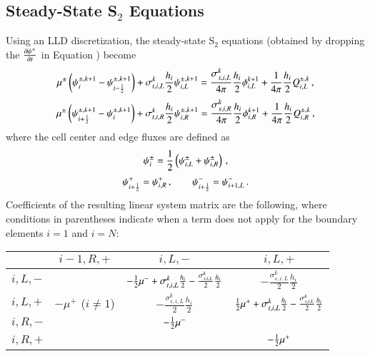 \documentclass[preprint,12pt]{elsarticle}
\newcommand{\sigsL}{\frac{\sigma_{s,i,L}^k}{2}}
\newcommand{\sigtL}{\sigma_{t,i,L}^k}
\newcommand{\halfh}{\frac{h_i}{2}}
\begin{document}
\subsection{Steady-State \texorpdfstring{S$_2$}{S-2} Equations}
Using an LLD discretization, the steady-state
S$_2$ equations (obtained by dropping the $\frac{\partial \psi^\pm}{\partial t}$ in Equation
) become
\begin{equation}
  \mu^\pm\fn{\psi^{\pm,k+1}_i - \psi^{\pm,k+1}_{i-\half}}
  +\sigma_{t,i,L}^k\frac{h_i}{2}\psi\iL^{\pm,k+1}=
  \frac{\sigma_{s,i,L}^k}{4\pi}\frac{h_i}{2}\phi\iL^{k+1}
  +\frac{1}{4\pi}\frac{h_i}{2}Q_{i,L}^{\pm,k} \pec
\lequ{S2ssL}
\end{equation}
\begin{equation}
  \mu^\pm\fn{\psi^{\pm,k+1}_{i+\half} - \psi^{\pm,k+1}_i}
  +\sigma_{t,i,R}^k\frac{h_i}{2}\psi\iR^{\pm,k+1}=
  \frac{\sigma_{s,i,R}^k}{4\pi}\frac{h_i}{2}\phi\iR^{k+1}
  +\frac{1}{4\pi}\frac{h_i}{2}Q_{i,R}^{\pm,k} \pec
\lequ{S2ssR}
\end{equation}
where the cell center and edge fluxes are defined as
\begin{equation}
  \psi_i^\pm=\frac{1}{2}\left( \psi_{i,L}^\pm + \psi_{i,R}^\pm \right) \, ,
\end{equation}
\begin{equation}
  \psi_{i+\frac{1}{2}}^+=\psi_{i,R}^+ \, ,\qquad \psi_{i+\frac{1}{2}}^-=\psi_{i+1,L}^- \, .
\end{equation}
Coefficients of the resulting linear system matrix are the following,
where conditions in parentheses indicate when a term does not
apply for the boundary elements $i=1$ and $i=N$:
\begin{center}
\begin{tabular}{|l||c|c|c|}\hline
          & $i-1,R,+$ & $i,L,-$ & $i,L,+$\\\hline\hline
  $i,L,-$ &
          & $-\half\mu^- + \sigtL\halfh - \sigsL\halfh$
          & $-\sigsL\halfh$ \\\hline
  $i,L,+$ & $-\mu^+$ ($i\ne 1$)
          & $-\sigsL\halfh$
          & $\half\mu^+ + \sigtL\halfh - \sigsL\halfh$ \\\hline
  $i,R,-$ &
          & $-\frac{1}{2}\mu^-$
          & \\\hline
  $i,R,+$ &
          &
          & $-\frac{1}{2}\mu^+$ \\\hline
\end{tabular}
\end{center}
\end{document}
